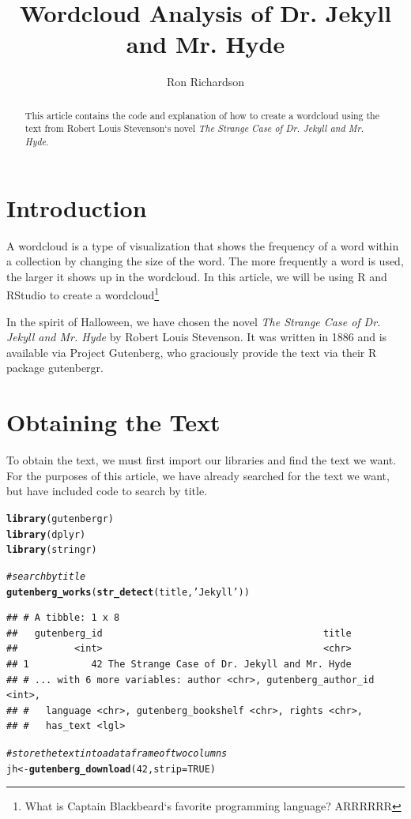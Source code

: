 \documentclass{article}\usepackage[]{graphicx}\usepackage[]{color}
\makeatletter
\newcommand{\hlnum}[1]{\textcolor[rgb]{0.686,0.059,0.569}{#1}}%
\newcommand{\hlstr}[1]{\textcolor[rgb]{0.192,0.494,0.8}{#1}}%
\newcommand{\hlcom}[1]{\textcolor[rgb]{0.678,0.584,0.686}{\textit{#1}}}%
\newcommand{\hlstd}[1]{\textcolor[rgb]{0.345,0.345,0.345}{#1}}%
\newcommand{\hlkwb}[1]{\textcolor[rgb]{0.69,0.353,0.396}{#1}}%
\newcommand{\hlkwc}[1]{\textcolor[rgb]{0.333,0.667,0.333}{#1}}%
\newcommand{\hlkwd}[1]{\textcolor[rgb]{0.737,0.353,0.396}{\textbf{#1}}}%
\newenvironment{kframe}{%
 \def\at@end@of@kframe{}%
 \ifinner\ifhmode%
  \def\at@end@of@kframe{\end{minipage}}%
  \begin{minipage}{\columnwidth}%
 \fi\fi%
 \def\FrameCommand##1{\hskip\@totalleftmargin \hskip-\fboxsep
 \colorbox{shadecolor}{##1}\hskip-\fboxsep
     \hskip-\linewidth \hskip-\@totalleftmargin \hskip\columnwidth}%
 \MakeFramed {\advance\hsize-\width
   \@totalleftmargin\z@ \linewidth\hsize
   \@setminipage}}%
 {\par\unskip\endMakeFramed%
 \at@end@of@kframe}
\newenvironment{knitrout}{}{} %
\makeatother
\begin{document}
\title{Wordcloud Analysis of Dr. Jekyll and Mr. Hyde}
\author{Ron Richardson}
\maketitle

\begin{abstract}
This article contains the code and explanation of how to create a wordcloud using the text from Robert Louis Stevenson`s novel \textit{The Strange Case of Dr. Jekyll and Mr. Hyde}.
\end{abstract}

\section{Introduction}
A wordcloud is a type of visualization that shows the frequency of a word within a collection by changing the size of the word. The more frequently a word is used, the larger it shows up in the wordcloud.  In this article, we will be using R and RStudio to create a wordcloud\footnote{What is Captain Blackbeard`s favorite programming language?  ARRRRRR}

In the spirit of Halloween, we have chosen the novel \textit{The Strange Case of Dr. Jekyll and Mr. Hyde} by Robert Louis Stevenson. It was written in 1886 and is available via Project Gutenberg, who graciously provide the text via their R package gutenbergr.

\section{Obtaining the Text}
To obtain the text, we must first import our libraries and find the text we want. For the purposes of this article, we have already searched for the text we want, but have included code to search by title.

\begin{knitrout}
\color{fgcolor}\begin{kframe}
\begin{alltt}
\hlkwd{library}\hlstd{(gutenbergr)}
\hlkwd{library}\hlstd{(dplyr)}
\hlkwd{library}\hlstd{(stringr)}

\hlcom{#search by title }
\hlkwd{gutenberg_works}\hlstd{(}\hlkwd{str_detect}\hlstd{(title,} \hlstr{'Jekyll'}\hlstd{))}
\end{alltt}
\begin{verbatim}
## # A tibble: 1 x 8
##   gutenberg_id                                       title
##          <int>                                       <chr>
## 1           42 The Strange Case of Dr. Jekyll and Mr. Hyde
## # ... with 6 more variables: author <chr>, gutenberg_author_id <int>,
## #   language <chr>, gutenberg_bookshelf <chr>, rights <chr>,
## #   has_text <lgl>
\end{verbatim}
\begin{alltt}
\hlcom{#store the text into a data frame of two columns}
\hlstd{jh}\hlkwb{<-}\hlkwd{gutenberg_download}\hlstd{(}\hlnum{42}\hlstd{,} \hlkwc{strip}\hlstd{=}\hlnum{TRUE}\hlstd{)}
\end{alltt}
\end{kframe}
\end{knitrout}
\end{document}
